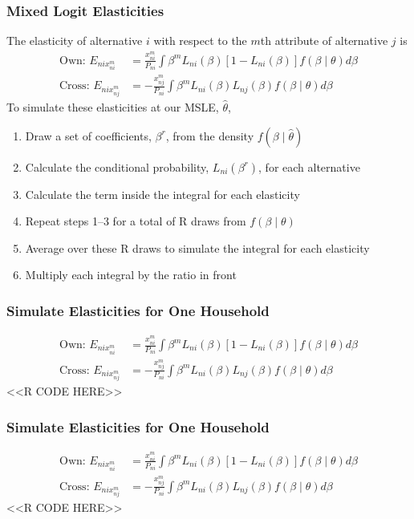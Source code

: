 \documentclass{beamer}
\begin{document}
\begin{frame}\frametitle{Mixed Logit Elasticities}
    The elasticity of alternative $i$ with respect to the $m$th attribute of alternative $j$ is
    \begin{align*}
    	\text{Own: } E_{nix_{ni}^m} &= \frac{x_{ni}^m}{P_{ni}} \int \beta^m L_{ni}(\beta) [1 - L_{ni}(\beta)] f(\beta \mid \theta) d \beta \\
    	\text{Cross: } E_{nix_{nj}^m} &= - \frac{x_{nj}^m}{P_{ni}} \int \beta^m L_{ni}(\beta) L_{nj}(\beta) f(\beta \mid \theta) d \beta
    \end{align*}
    To simulate these elasticities at our MSLE, $\hat{\theta}$,
    \begin{enumerate}
        \item Draw a set of coefficients, $\beta^r$, from the density $f(\beta \mid \hat{\theta})$
        \item Calculate the conditional probability, $L_{ni}(\beta^r)$, for each alternative
        \item Calculate the term inside the integral for each elasticity
        \item Repeat steps 1--3 for a total of R draws from $f(\beta \mid \theta)$
        \item Average over these R draws to simulate the integral for each elasticity
        \item Multiply each integral by the ratio in front
    \end{enumerate}
\end{frame}

\begin{frame}[fragile]\frametitle{Simulate Elasticities for One Household}
	\begin{align*}
    	\text{Own: } E_{nix_{ni}^m} &= \frac{x_{ni}^m}{P_{ni}} \int \beta^m L_{ni}(\beta) [1 - L_{ni}(\beta)] f(\beta \mid \theta) d \beta \\
    	\text{Cross: } E_{nix_{nj}^m} &= - \frac{x_{nj}^m}{P_{ni}} \int \beta^m L_{ni}(\beta) L_{nj}(\beta) f(\beta \mid \theta) d \beta
    \end{align*}
    \vspace{1ex}
    <<R CODE HERE>>
\end{frame}

\begin{frame}[fragile]\frametitle{Simulate Elasticities for One Household}
	\begin{align*}
    	\text{Own: } E_{nix_{ni}^m} &= \frac{x_{ni}^m}{P_{ni}} \int \beta^m L_{ni}(\beta) [1 - L_{ni}(\beta)] f(\beta \mid \theta) d \beta \\
    	\text{Cross: } E_{nix_{nj}^m} &= - \frac{x_{nj}^m}{P_{ni}} \int \beta^m L_{ni}(\beta) L_{nj}(\beta) f(\beta \mid \theta) d \beta
    \end{align*}
    \vspace{1ex}
    <<R CODE HERE>>
\end{frame}
\end{document}
